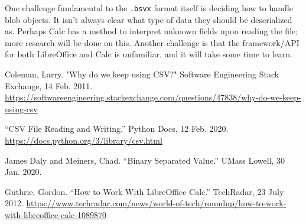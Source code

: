 \documentclass[10pt]{article}
\begin{document}
\indent{}
One challenge fundamental to the \texttt{.bsvx} format itself is deciding how to handle blob objects.
It isn’t always clear what type of data they should be deserialized as.
Perhaps Calc has a method to interpret unknown fields upon reading the file; more research will be done on this.
Another challenge is that the framework/API for both LibreOffice and Calc is unfamiliar, and it will take some time to learn.

\clearpage
{}
\printnoidxglossary[nonumberlist]

\clearpage
\begin{thebibliography}{9}

    Coleman, Larry.
    "Why do we keep using CSV?"
    Software Engineering Stack Exchange,
    14 Feb. 2011.
    \url{https://softwareengineering.stackexchange.com/questions/47838/why-do-we-keep-using-csv}

    “CSV File Reading and Writing.”
    Python Docs,
    12 Feb. 2020.
    \url{https://docs.python.org/3/library/csv.html}

    James Daly and Meiners, Chad.
    “Binary Separated Value.”
    UMass Lowell,
    30 Jan. 2020.

    Guthrie, Gordon.
    “How to Work With LibreOffice Calc.”
    TechRadar,
    23 July 2012.
    \url{https://www.techradar.com/news/world-of-tech/roundup/how-to-work-with-libreoffice-calc-1089870}
  
\end{thebibliography}
\end{document}
